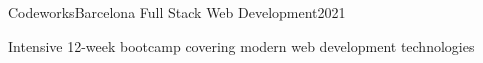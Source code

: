 \resumeSubheading
  {Codeworks}{Barcelona}
  {Full Stack Web Development}{2021}
  \vspace{\experienceItemSpacing}
  \resumeItemListStart
\item Intensive 12-week bootcamp covering modern web development technologies
  \resumeItemListEnd
